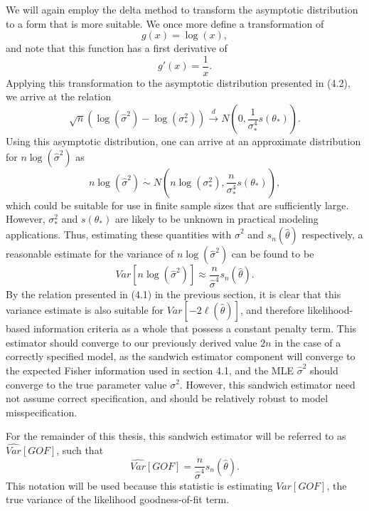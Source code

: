 		We will again employ the delta method to transform the asymptotic distribution to a form that is more suitable. We once more define a transformation of
		\begin{equation*}
			g(x) = \log(x) ,
		\end{equation*}
		and note that this function has a first derivative of
		\begin{equation*}
			g'(x) = \frac{1}{x} .
		\end{equation*}
		Applying this transformation to the asymptotic distribution presented in (4.2), we arrive at the relation
		\begin{equation*}
			\sqrt{n} ( \log (\hat{\sigma}^2) - \log(\sigma_*^2)) \xrightarrow[]{d} N \left( 0, \frac{1}{\sigma_*^4} s(\theta_*) \right) .
		\end{equation*}
		Using this asymptotic distribution, one can arrive at an approximate distribution for $n\log(\hat{\sigma}^2)$ as
		\begin{equation*}
			n\log(\hat{\sigma}^2) \; \dot\sim \; N \left( n\log(\sigma_* ^2), \frac{n}{\sigma_*^4} s(\theta_*) \right) ,
		\end{equation*}
		which could be suitable for use in finite sample sizes that are sufficiently large. However, $\sigma_*^2$ and $s(\theta_*)$ are likely to be unknown in practical modeling
		applications. Thus, estimating these quantities with $\hat{\sigma}^2$ and $s_n(\hat{\theta})$ respectively, a reasonable estimate for the variance of $n\log(\hat{\sigma}^2)$ can
		be found to be
		\begin{equation*}
			Var \left[ n\log(\hat{\sigma}^2) \right] \approx \frac{n}{\hat{\sigma}^4} s_n(\hat{\theta}) .
		\end{equation*}
		By the relation presented in (4.1) in the previous section, it is clear that this variance estimate is also suitable for $Var \left[ -2 \ell (\hat{\theta}  ) \right]$, and therefore
		likelihood-based information criteria as a whole that possess a constant penalty term. This estimator should converge to our previously derived value $2n$ in the case of a correctly
		specified model, as the sandwich estimator component will converge to the expected Fisher information used in section 4.1, and the MLE $\hat{\sigma}^2$ should converge to the true
		parameter value $\sigma^2$. However, this sandwich estimator need not assume correct specification, and should be relatively robust to model misspecification.
		
		For the remainder of this thesis, this sandwich estimator will be referred to as $\widehat{Var}[GOF]$, such that
		\begin{equation*}
			\widehat{Var}[GOF] = \frac{n}{\hat{\sigma}^4} s_n(\hat{\theta}) .
		\end{equation*}
		This notation will be used because this statistic is estimating $Var[GOF]$, the true variance of the likelihood goodness-of-fit
		term.
		
